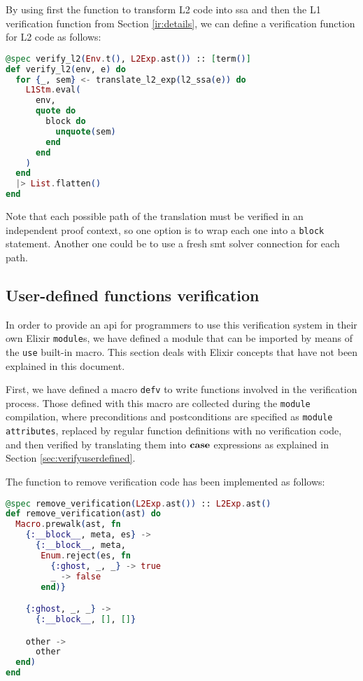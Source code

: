 By using first the function to transform L2 code into \gls{ssa} and then the L1
verification function from Section \ref{ir:details}, we can define a
verification function for L2 code as follows:

\begin{lstlisting}[language=elixir,numbers=none,frame=none]
@spec verify_l2(Env.t(), L2Exp.ast()) :: [term()]
def verify_l2(env, e) do
  for {_, sem} <- translate_l2_exp(l2_ssa(e)) do
    L1Stm.eval(
      env,
      quote do
        block do
          unquote(sem)
        end
      end
    )
  end
  |> List.flatten()
end
\end{lstlisting}

Note that each possible path of the translation must be verified in an
independent proof context, so one option is to wrap each one into a \verb|block|
statement. Another one could be to use a fresh \acrshort{smt} solver connection
for each path.

\subsection{User-defined functions verification}

In order to provide an \gls{api} for programmers to use this verification system
in their own Elixir \verb|module|s, we have defined a module that can be
imported by means of the \verb|use| built-in macro. This section deals with
Elixir concepts that have not been explained in this document.

First, we have defined a macro \verb|defv| to write functions involved in the
verification process. Those defined with this macro are collected during the
\verb|module| compilation, where preconditions and postconditions are specified
as \verb|module attributes|, replaced by regular function definitions with no
verification code, and then verified by translating them into $\textbf{case}$
expressions as explained in Section \ref{sec:verifyuserdefined}.

The function to remove verification code has been implemented as follows:

\begin{lstlisting}[language=elixir,numbers=none,frame=none]
@spec remove_verification(L2Exp.ast()) :: L2Exp.ast()
def remove_verification(ast) do
  Macro.prewalk(ast, fn
    {:__block__, meta, es} ->
      {:__block__, meta,
       Enum.reject(es, fn
         {:ghost, _, _} -> true
         _ -> false
       end)}

    {:ghost, _, _} ->
      {:__block__, [], []}

    other ->
      other
  end)
end
\end{lstlisting}

\begin{lstlisting}[language=elixir,numbers=none,frame=none]
  
\end{lstlisting} 
